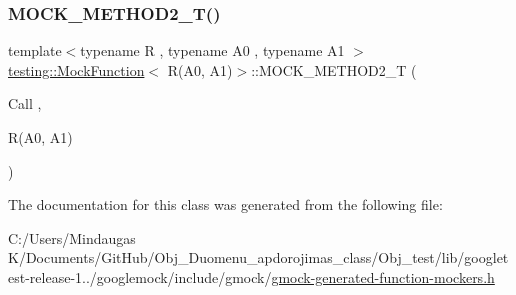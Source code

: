\subsubsection{\texorpdfstring{MOCK\_METHOD2\_T()}{MOCK\_METHOD2\_T()}}
{\footnotesize\ttfamily template$<$typename R , typename A0 , typename A1 $>$ \\
\mbox{\hyperlink{classtesting_1_1_mock_function}{testing\+::\+Mock\+Function}}$<$ R(A0, A1)$>$\+::M\+O\+C\+K\+\_\+\+M\+E\+T\+H\+O\+D2\+\_\+T (\begin{DoxyParamCaption}\item[{Call}]{,  }\item[{R(A0, A1)}]{ }\end{DoxyParamCaption})}



The documentation for this class was generated from the following file\+:\begin{DoxyCompactItemize}
\item 
C\+:/\+Users/\+Mindaugas K/\+Documents/\+Git\+Hub/\+Obj\+\_\+\+Duomenu\+\_\+apdorojimas\+\_\+class/\+Obj\+\_\+test/lib/googletest-\/release-\/1../googlemock/include/gmock/\mbox{\hyperlink{_obj__test_2lib_2googletest-release-1_88_81_2googlemock_2include_2gmock_2gmock-generated-function-mockers_8h}{gmock-\/generated-\/function-\/mockers.\+h}}\end{DoxyCompactItemize}
